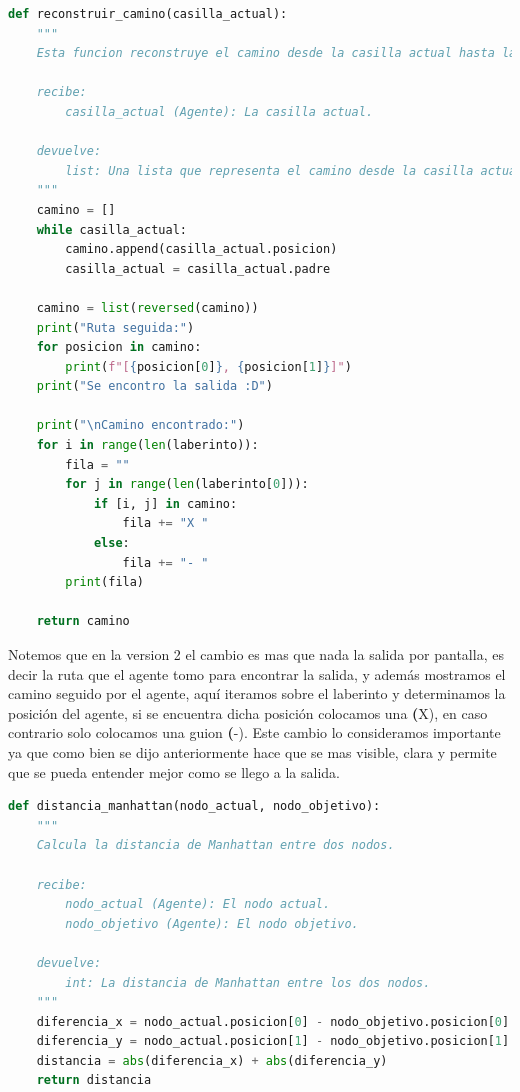 \begin{lstlisting}[language=Python, caption=Version 2: reconstruircamino]
    def reconstruir_camino(casilla_actual):
    """
    Esta funcion reconstruye el camino desde la casilla actual hasta la posicion inicial del agente.

    recibe:
        casilla_actual (Agente): La casilla actual.

    devuelve:
        list: Una lista que representa el camino desde la casilla actual hasta la posicion inicial del agente.
    """
    camino = []
    while casilla_actual:
        camino.append(casilla_actual.posicion)
        casilla_actual = casilla_actual.padre

    camino = list(reversed(camino))
    print("Ruta seguida:")
    for posicion in camino:
        print(f"[{posicion[0]}, {posicion[1]}]")
    print("Se encontro la salida :D")  

    print("\nCamino encontrado:")
    for i in range(len(laberinto)):
        fila = ""
        for j in range(len(laberinto[0])):
            if [i, j] in camino:
                fila += "X "
            else:
                fila += "- "
        print(fila)

    return camino
\end{lstlisting}

Notemos que en la version 2 el cambio es mas que nada la salida por pantalla, 
es decir la ruta que el agente tomo para encontrar la salida, y además mostramos 
el camino seguido por el agente, aquí iteramos sobre el laberinto y determinamos 
la posición del agente, si se encuentra dicha posición colocamos una \textbf(X), 
en caso contrario solo colocamos una guion \textbf(-). Este cambio lo consideramos 
importante ya que como bien se dijo anteriormente hace que se mas visible, clara y 
permite que se pueda entender mejor como se llego a la salida.

\begin{lstlisting}[language=Python, caption=Version 1: distanciamanhattan]
    def distancia_manhattan(nodo_actual, nodo_objetivo):
    """
    Calcula la distancia de Manhattan entre dos nodos.

    recibe:
        nodo_actual (Agente): El nodo actual.
        nodo_objetivo (Agente): El nodo objetivo.

    devuelve:
        int: La distancia de Manhattan entre los dos nodos.
    """
    diferencia_x = nodo_actual.posicion[0] - nodo_objetivo.posicion[0]
    diferencia_y = nodo_actual.posicion[1] - nodo_objetivo.posicion[1]
    distancia = abs(diferencia_x) + abs(diferencia_y)
    return distancia
\end{lstlisting}

